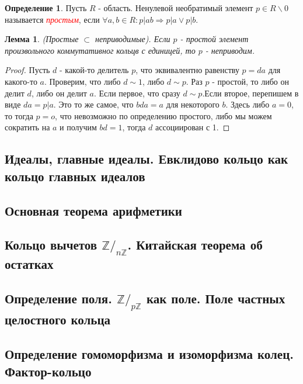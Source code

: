 \documentclass[a4paper,100pt]{article}
\theoremstyle{indented}
\newtheorem{lemma}{Лемма}
\theoremstyle{definition}
\newtheorem{defn}{Определение}
\theoremstyle{remark}
\begin{document}
\begin{defn}
    Пусть $R$ - область. Ненулевой необратимый элемент $p\in R\backslash 0$ называется \hypertarget{n8}{\textcolor{red}{\textit{простым}}}, если $\forall a,b\in R: p\vert ab \Longrightarrow p\vert a \vee p\vert b$.
\end{defn}

\begin{lemma}
    (Простые $\subset$ неприводимые). Если $p$ - простой элемент произвольного коммутативног кольцв с единицей, то $p$ - неприводим.
\end{lemma}

\begin{proof}
    Пусть $d$ - какой-то делитель $p$, что эквивалентно равенству $p=da$ для какого-то $a$. Проверим, что либо $d\sim 1$, либо $d\sim p$. Раз $p$ - простой, то либо он делит $d$, либо он делит $a$. Если первое, что сразу $d\sim p$.Если второе, перепишем в виде $da=p\vert a$. Это то же самое, что $bda=a$ для некоторого $b$. Здесь либо $a=0$, то тогда $p=o$, что невозможно по определению простого, либо мы можем сократить на $a$ и получим $bd=1$, тогда $d$ ассоциирован с 1.
\end{proof}

\resetall

\subsection{Идеалы, главные идеалы. Евклидово кольцо как кольцо главных идеалов}

\subsection{Основная теорема арифметики}

\subsection{Кольцо вычетов $\mathbb{Z}/_{n\mathbb{Z}}$. Китайская теорема об остатках}

\subsection{Определение поля. $\mathbb{Z}/_{p\mathbb{Z}}$ как поле. Поле частных целостного кольца}

\subsection{Определение гомоморфизма и изоморфизма колец. Фактор-кольцо}
\end{document}

